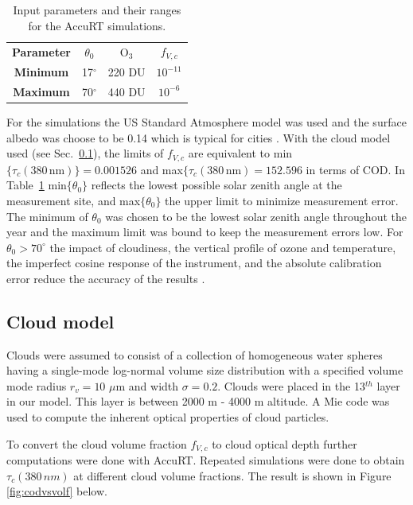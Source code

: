 \documentclass{optica-article}
\begin{document}
\begin{table}[H]	
	\centering
	\begin{tabular}{|c|c|c|c|}
		\hline
		\textbf{Parameter}	& $\theta_0$ & O$_3$ & $f_{V,c}$  \\
		\Xhline{2\arrayrulewidth}
		\textbf{Minimum	}& 17$^{\circ}$ & 220 DU & $10^{-11}$  \\
		\textbf{Maximum	}& 70$^{\circ}$ & 440 DU & $10^{-6}$ \\
		\hline
	\end{tabular}
	\caption{Input parameters and their ranges for the AccuRT simulations.}
	\label{tab:accurtinput_ozone}
\end{table}

For the simulations the US Standard Atmosphere \cite{USstandardatmosphere} model was used and the surface albedo was choose to be 0.14 which is typical for cities \cite{Sugawara:2014}.
With the cloud model used (see Sec.~\ref{sec-cloud}), the limits of $f_{V,c}$ are equivalent to min$\{\tau_c(380 \, \text{nm})\} = 0.001526$ and max$\{\tau_c(380 \, \text{nm}) = 152.596$ in terms of COD.
In Table~\ref{tab:accurtinput_ozone} min$\{\theta_0\}$ reflects the lowest possible solar zenith angle at the measurement site, and  max$\{\theta_0\}$ the upper limit to minimize measurement error. 
The minimum of  $\theta_0$ was chosen to be the lowest solar zenith angle throughout the year and the maximum limit was bound to keep the measurement errors low. 
For $\theta_0 > 70^{\circ}$ the impact of cloudiness, the vertical profile of ozone and temperature, the imperfect cosine response of the instrument, and the absolute calibration error reduce the accuracy of the results \cite{Kazantzidis:2009}.


 \subsection{Cloud model}
 \label{sec-cloud}

Clouds were assumed to consist of a collection of homogeneous water spheres having a single-mode log-normal volume size distribution with a specified volume mode radius $r_v=10$ $\mu$m and width $\sigma = 0.2$. 
Clouds were placed in the 13$^{th}$ layer in our model. 
This layer is between 2000 m - 4000 m altitude.
A Mie code was used to compute the inherent optical properties of cloud particles.

To convert the cloud volume fraction $f_{V,c}$ to cloud optical depth further computations were done with AccuRT.
Repeated simulations were done to obtain $\tau_c{\scriptstyle(380 \, nm)}$ at different cloud volume fractions.
The result is shown in Figure \ref{fig:codvsvolf} below.
\end{document}

